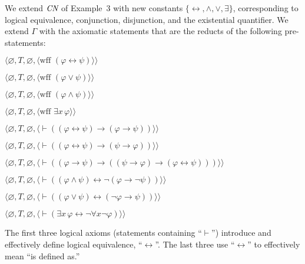 We extend $\mbox{\em CN}$ of Example~3 with new constants $\{\leftrightarrow,
\wedge,\vee,\exists\}$, corresponding to logical equivalence,
conjunction, disjunction, and the existential quantifier.  We extend $\Gamma$ with the axiomatic statements that are
the reducts of the following pre-statements:
\begin{list}{}{\itemsep 0.0pt}
      \item[] $\langle\varnothing,T,\varnothing,
               \langle \mbox{wff\ }(\varphi\leftrightarrow\psi)\rangle\rangle$
      \item[] $\langle\varnothing,T,\varnothing,
               \langle \mbox{wff\ }(\varphi\vee\psi)\rangle\rangle$
      \item[] $\langle\varnothing,T,\varnothing,
               \langle \mbox{wff\ }(\varphi\wedge\psi)\rangle\rangle$
      \item[] $\langle\varnothing,T,\varnothing,
               \langle \mbox{wff\ }\exists x\, \varphi\rangle\rangle$
  \item[] $\langle\varnothing,T,\varnothing,
     \langle\vdash ( ( \varphi \leftrightarrow \psi ) \to
     ( \varphi \to \psi ) )\rangle\rangle$
  \item[] $\langle\varnothing,T,\varnothing,
     \langle\vdash ((\varphi\leftrightarrow\psi)\to
    (\psi\to\varphi))\rangle\rangle$
  \item[] $\langle\varnothing,T,\varnothing,
     \langle\vdash ((\varphi\to\psi)\to(
     (\psi\to\varphi)\to(\varphi
     \leftrightarrow\psi)))\rangle\rangle$
  \item[] $\langle\varnothing,T,\varnothing,
     \langle\vdash (( \varphi \wedge \psi ) \leftrightarrow\neg ( \varphi
     \to \neg \psi )) \rangle\rangle$
  \item[] $\langle\varnothing,T,\varnothing,
     \langle\vdash (( \varphi \vee \psi ) \leftrightarrow (\neg \varphi
     \to \psi )) \rangle\rangle$
  \item[] $\langle\varnothing,T,\varnothing,
     \langle\vdash (\exists x \,\varphi\leftrightarrow
     \lnot \forall x \lnot \varphi)\rangle\rangle$
\end{list}
The first three logical axioms (statements containing ``$\vdash$'') introduce
and effectively define logical equivalence, ``$\leftrightarrow$''.  The last
three use ``$\leftrightarrow$'' to effectively mean ``is defined as.''

